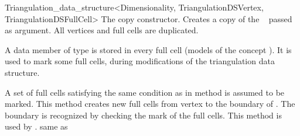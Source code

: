 \begin{ccRefClass}{Triangulation_data_structure<Dimensionality, TriangulationDSVertex, TriangulationDSFullCell>}
{The copy constructor. Creates a copy of the \ccRefName\  passed as
    argument. All vertices and full cells are duplicated.}

\begin{ccAdvanced}

\ccTypes

{A data member of type  is stored in every full cell (models
of the concept ).  It is used to mark
some 
full cells, during modifications of the triangulation data structure.}


{A set  of full cells satisfying the same condition as in method
\ccRefName{} is assumed to be marked. This
method creates new full cells from vertex  to the boundary of .
The boundary is recognized by checking the mark of the full cells.
This method is used by \ccRefName{}.
\ccPrecond same as \ccRefName{} 
}

\end{ccAdvanced}

\ccSeeAlso

\\
\\

\end{ccRefClass}
